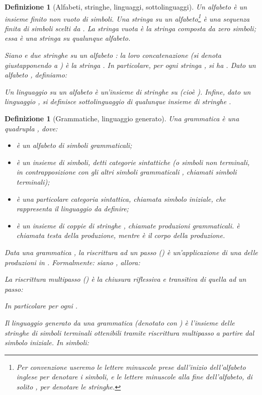 \documentclass[12pt,a4paper,openright,twoside]{report}
\newtheorem{dfn}[thm]{Definizione}
\begin{document}
\begin{dfn}[Alfabeti, stringhe, linguaggi, sottolinguaggi]
Un \emph{alfabeto}  \`e un insieme finito non vuoto di \emph{simboli}. Una \emph{stringa su un alfabeto}\footnote{Per convenzione useremo le lettere minuscole prese dall'inizio dell'alfabeto inglese per denotare i simboli, e le lettere minuscole alla fine dell'alfabeto, di solito , per denotare le stringhe.}  \`e una sequenza finita di simboli scelti da . La \emph{stringa vuota}  \`e la stringa composta da zero simboli; essa \`e una stringa su qualunque alfabeto.

Siano  e  due stringhe su un alfabeto : la loro \emph{concatenazione} (si denota giustapponendo  a ) \`e la stringa . In particolare, per ogni stringa , si ha . Dato un alfabeto , definiamo:


Un \emph{linguaggio}  \emph{su un alfabeto}  \`e un'insieme di stringhe su  (cio\`e ). Infine, dato un linguaggio , si definisce \emph{sottolinguaggio di}  qualunque insieme di stringhe .
\end{dfn}

\begin{dfn}[Grammatiche, linguaggio generato]
Una grammatica \`e una quadrupla , dove:
\begin{itemize}
	\item  \`e un alfabeto di \emph{simboli grammaticali};
	\item  \`e un insieme di simboli, detti \emph{categorie sintattiche} (o \emph{simboli non terminali}, in contrapposizione con gli altri simboli grammaticali , chiamati \emph{simboli terminali});
	\item  \`e una particolare categoria sintattica, chiamata \emph{simbolo iniziale}, che rappresenta il linguaggio da definire;
	\item  \`e un insieme di coppie di stringhe , chiamate \emph{produzioni grammaticali}.  \`e chiamata \emph{testa della produzione}, mentre  \`e il \emph{corpo della produzione}.
\end{itemize}

Data una grammatica , la \emph{riscrittura ad un passo} () \`e un'applicazione di una delle produzioni in . Formalmente: siano , allora:

La \emph{riscrittura multipasso} () \`e la chiusura riflessiva e transitiva di quella ad un passo:

In particolare  per ogni .

Il \emph{linguaggio generato da una grammatica}  (denotato con ) \`e l'insieme delle stringhe di simboli terminali ottenibili tramite riscrittura multipasso a partire dal simbolo iniziale. In simboli:

\end{dfn}
\end{document}
